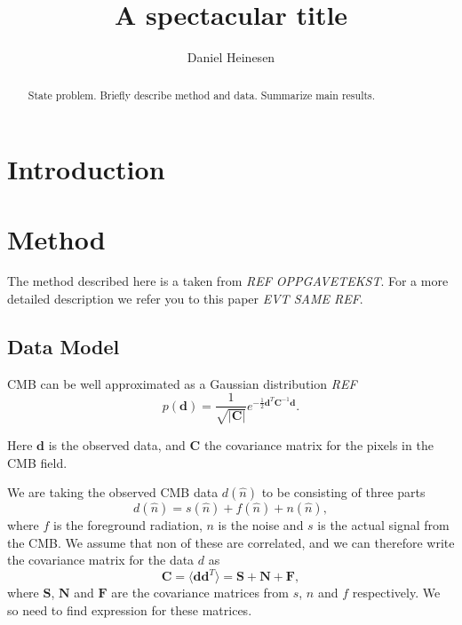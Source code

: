 \documentclass{emulateapj}
\begin{document}
\title{A spectacular title}

\author{Daniel Heinesen}





\begin{abstract}
  State problem. Briefly describe method and data. Summarize main results.
\end{abstract}

\section{Introduction}
\label{sec:introduction}






\section{Method}
The method described here is a taken from \emph{REF OPPGAVETEKST}. For a more detailed description we refer you to this paper \emph{EVT SAME REF}.
\label{sec:method}

\subsection{Data Model}
CMB can be well approximated as a Gaussian distribution \emph{REF}
\begin{equation}
p(\mathbf{d}) = \frac{1}{\sqrt{|\mathbf{C}|}}e^{-\frac{1}{2}\mathbf{d}^T \mathbf{C}^{-1}\mathbf{d}}.
 \end{equation} 

Here $\mathbf{d}$ is the observed data, and $\mathbf{C}$ the covariance matrix for the pixels in the CMB field.

We are taking the observed CMB data $d(\hat{n})$ to be consisting of three parts
\begin{equation}
d(\hat{n}) = s(\hat{n}) + f(\hat{n}) + n(\hat{n}),
\end{equation}
where $f$ is the foreground radiation, $n$ is the noise and $s$ is the actual signal from the CMB. We assume that non of these are correlated, and we can therefore write the covariance matrix for the data $d$ as 
\begin{equation}
\mathbf{C} = \langle \mathbf{d}\mathbf{d}^T\rangle = \mathbf{S} + \mathbf{N} + \mathbf{F},
\end{equation}
where $\mathbf{S}$, $\mathbf{N}$ and $\mathbf{F}$ are the covariance matrices from $s$, $n$ and $f$ respectively. We so need to find expression for these matrices. 
\end{document}
